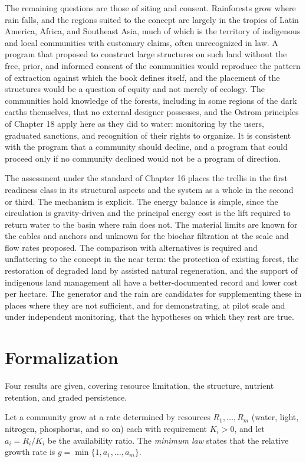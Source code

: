 The remaining questions are those of siting and consent. Rainforests grow where rain falls, and the regions suited to the concept are largely in the tropics of Latin America, Africa, and Southeast Asia, much of which is the territory of indigenous and local communities with customary claims, often unrecognized in law. A program that proposed to construct large structures on such land without the free, prior, and informed consent of the communities would reproduce the pattern of extraction against which the book defines itself, and the placement of the structures would be a question of equity and not merely of ecology. The communities hold knowledge of the forests, including in some regions of the dark earths themselves, that no external designer possesses, and the Ostrom principles of Chapter 18 apply here as they did to water: monitoring by the users, graduated sanctions, and recognition of their rights to organize. It is consistent with the program that a community should decline, and a program that could proceed only if no community declined would not be a program of direction.

The assessment under the standard of Chapter 16 places the trellis in the first readiness class in its structural aspects and the system as a whole in the second or third. The mechanism is explicit. The energy balance is simple, since the circulation is gravity-driven and the principal energy cost is the lift required to return water to the basin where rain does not. The material limits are known for the cables and anchors and unknown for the biochar filtration at the scale and flow rates proposed. The comparison with alternatives is required and unflattering to the concept in the near term: the protection of existing forest, the restoration of degraded land by assisted natural regeneration, and the support of indigenous land management all have a better-documented record and lower cost per hectare. The generator and the rain are candidates for supplementing these in places where they are not sufficient, and for demonstrating, at pilot scale and under independent monitoring, that the hypotheses on which they rest are true.

\section*{Formalization}

Four results are given, covering resource limitation, the structure, nutrient retention, and graded persistence.

Let a community grow at a rate determined by resources $R_1,\dots,R_m$ (water, light, nitrogen, phosphorus, and so on) each with requirement $K_i>0$, and let $a_i=R_i/K_i$ be the availability ratio. The \emph{minimum law} states that the relative growth rate is $g=\min\{1,a_1,\dots,a_m\}$.

